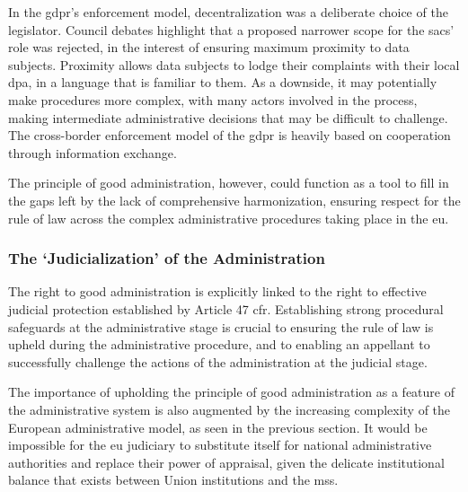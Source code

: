 In the \gls{gdpr}'s enforcement model, decentralization was a deliberate choice of the legislator.
Council debates highlight that a proposed narrower scope for the \glspl{sac}' role was rejected, in the interest of ensuring maximum proximity to data subjects.\autocite[para 5]{councildebateSAC}
Proximity allows data subjects to lodge their complaints with their local \gls{dpa}, in a language that is familiar to them.
As a downside, it may potentially make procedures more complex, with many actors involved in the process, making intermediate administrative decisions that may be difficult to challenge.
The cross-border enforcement model of the \gls{gdpr} is heavily based on cooperation through information exchange.\autocite[140]{hofmannCompositeDecisionMaking2009}

The principle of good administration, however, could function as a tool to fill in the gaps left by the lack of comprehensive harmonization, ensuring respect for the rule of law across the complex administrative procedures taking place in the \gls{eu}.\autocites[92--93]{mihaescu-evansRightGoodAdministration2015}[351]{nehlGoodAdminProceduralRight2009}

\subsubsection{The `Judicialization' of the Administration}
\label{sec:ch2-judicialization}

The right to good administration is explicitly linked to the right to effective judicial protection established by Article 47 \gls{cfr}.\autocites[Article 41]{ExplanationsCFR}[79--80]{mihaescu-evansRightGoodAdministration2015}
Establishing strong procedural safeguards at the administrative stage is crucial to ensuring the rule of law is upheld during the administrative procedure, and to enabling an appellant to successfully challenge the actions of the administration at the judicial stage.\autocite[79--81]{mihaescu-evansRightGoodAdministration2015}

The importance of upholding the principle of good administration as a feature of the administrative system is also augmented by the increasing complexity of the European administrative model, as seen in the previous section.\autocite[86--87]{mihaescu-evansRightGoodAdministration2015}
It would be impossible for the \gls{eu} judiciary to substitute itself for national administrative authorities and replace their power of appraisal, given the delicate institutional balance that exists between Union institutions and the \glspl{ms}.\autocite[85--87]{mihaescu-evansRightGoodAdministration2015}

